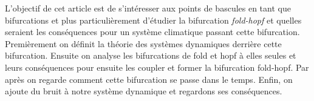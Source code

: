 
L'objectif de cet article est de s'intéresser aux points de bascules en tant que bifurcations et plus particulièrement d'étudier la bifurcation \emph{fold-hopf} et quelles seraient les conséquences pour un système climatique passant cette bifurcation. Premièrement on définit la théorie des systèmes dynamiques derrière cette bifurcation. Ensuite on analyse les bifurcations de fold et hopf à elles seules et leurs conséquences pour ensuite les coupler et former la bifurcation fold-hopf. Par après on regarde comment cette bifurcation se passe dans le temps. Enfin, on ajoute du bruit à notre système dynamique et regardons ses conséquences.
